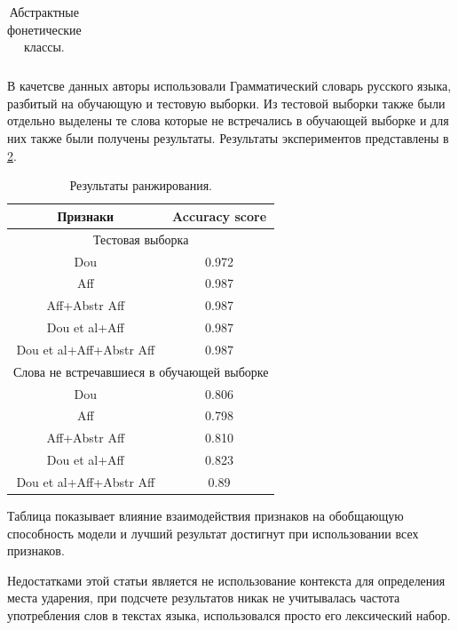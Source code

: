 \documentclass[14pt, a4paper, russian]{report}
\begin{document}
\begin{normalsize}
\begin{table}[H]
\begin{small}
\begin{center}
\begin{tabular}{|c|c|}
			\end{tabular}
		\end{center}
	\end{small}
	\caption{ Абстрактные фонетические классы.}
	\label{table:phon_class}
\end{table}

В качетсве данных авторы использовали Грамматический словарь русского языка\cite{zaliz}, разбитый на обучающую и тестовую выборки. Из тестовой выборки также были отдельно выделены те слова которые не встречались в обучающей выборке  и для них также были получены  результаты. Результаты экспериментов представлены в \cref{table:range_res}.
\begin{table}[H]
	\begin{small}
		\begin{center}
			\begin{tabular}{|c|c|}
				\hline
				Признаки & Accuracy score \\
				\hline
				\multicolumn{2}{|c|}{Тестовая выборка} \\			
				\hline
				Dou &0.972 \\
				\hline
				Aff & 0.987 \\
				\hline
				Aff+Abstr Aff & 0.987 \\
				\hline
				Dou et al+Aff & 0.987 \\
				\hline
				Dou et al+Aff+Abstr Aff & 0.987 \\
				\hline
				\multicolumn{2}{|c|}{Слова не встречавшиеся в обучающей выборке} \\			
				\hline
				Dou &0.806 \\
				\hline
				Aff & 0.798 \\
				\hline
				Aff+Abstr Aff & 0.810 \\
				\hline
				Dou et al+Aff & 0.823 \\
				\hline
				Dou et al+Aff+Abstr Aff & 0.89 \\
				\hline
				
			\end{tabular}
		\end{center}
	\end{small}
	\caption{Результаты ранжирования.}
	\label{table:range_res}
\end{table}

Таблица показывает  влияние взаимодействия признаков на обобщающую способность модели и лучший результат достигнут при использовании всех признаков.

Недостатками этой статьи является не использование контекста для определения места ударения, при подсчете результатов никак не учитывалась частота употребления слов в текстах языка, использовался просто его лексический набор.


\end{normalsize}
\end{document}
